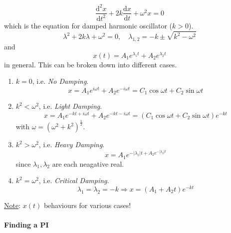 \documentclass[12pt]{report}
\theoremstyle{definition}
\begin{document}
\begin{ex}
    \[
        \frac{\mathrm{d}^{2}x}{\mathrm{d}t^{2}} + 2k\frac{\mathrm{d}x}{\mathrm{d}t} + \omega^{2}x = 0
    \]
    which is the equation for damped harmonic oscillator ($k > 0$).\[
        \lambda^{2} + 2k\lambda + \omega^{2} = 0, \quad
        \lambda_{1, 2} = -k \pm \sqrt{k^{2} - \omega^{2}}
    \]
    and \[
        x(t) = A_1 e^{\lambda_1 t} + A_2 e^{\lambda_2 t}
    \] in general. This can be broken down into different cases.
    \begin{enumerate}[label = (\arabic*)]
        \item $k = 0$, i.e. \emph{No Damping}.\[
            x = A_1 e^{i\omega t} + A_2 e^{-i\omega t}
            = C_1 \cos{\omega t} + C_2 \sin{\omega t}
        \]

    \item $k^{2} < \omega^{2}$, i.e. \emph{Light Damping}.\[
        x = A_1 e^{-kt + i\omega t} + A_2 e^{-kt - i\omega t}
        = (C_1 \cos{\omega t} + C_2 \sin{\omega t}) e^{-kt}
    \]with $\omega = {(\omega^{2} + k^{2})}^{\frac{1}{2}}$.

\item $k^{2} > \omega^{2}$, i.e. \emph{Heavy Damping}.\[
    x = A_1 e^{-|\lambda_1|t + A_2 e^{-|\lambda_2|t}}
\]
since $\lambda_1, \lambda_2$ are each neagative real.

\item $k^{2} = \omega^{2}$, i.e. \emph{Critical Damping}.\[
        \lambda_1 = \lambda_2 = -k \Rightarrow x = (A_1 + A_2 t)e^{-kt}
\]
    \end{enumerate}
    \underline{Note}: $x(t)$ behaviours for various cases!
\end{ex}

\paragraph{Finding a PI}
\end{document}
